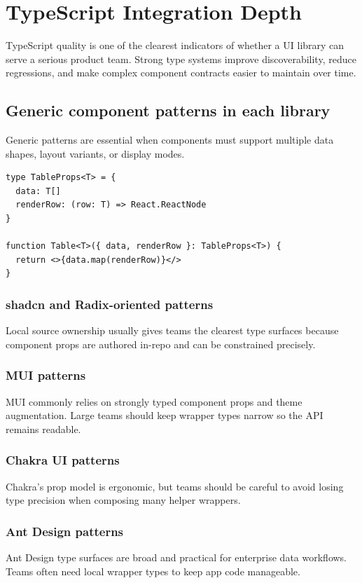 \clearpage
\section{TypeScript Integration Depth}

TypeScript quality is one of the clearest indicators of whether a UI library can serve a serious product team. Strong type systems improve discoverability, reduce regressions, and make complex component contracts easier to maintain over time.

\subsection{Generic component patterns in each library}
Generic patterns are essential when components must support multiple data shapes, layout variants, or display modes.

\begin{verbatim}
type TableProps<T> = {
  data: T[]
  renderRow: (row: T) => React.ReactNode
}

function Table<T>({ data, renderRow }: TableProps<T>) {
  return <>{data.map(renderRow)}</>
}
\end{verbatim}

\subsubsection{shadcn and Radix-oriented patterns}
Local source ownership usually gives teams the clearest type surfaces because component props are authored in-repo and can be constrained precisely.

\subsubsection{MUI patterns}
MUI commonly relies on strongly typed component props and theme augmentation. Large teams should keep wrapper types narrow so the API remains readable.

\subsubsection{Chakra UI patterns}
Chakra's prop model is ergonomic, but teams should be careful to avoid losing type precision when composing many helper wrappers.

\subsubsection{Ant Design patterns}
Ant Design type surfaces are broad and practical for enterprise data workflows. Teams often need local wrapper types to keep app code manageable.

